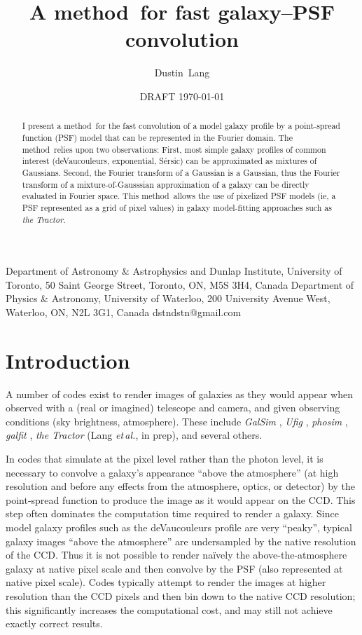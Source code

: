 \documentclass[11pt,preprint]{aastex}
\newcommand{\foreign}[1]{\emph{#1}}
\newcommand{\etal}{\foreign{et\,al.}}
\newcommand{\project}[1]{\textsl{#1}}
\newcommand{\trick}{method}
\begin{document}
\title{A \trick\ for fast galaxy--PSF convolution}
\author{Dustin~Lang}
%
{Department of Astronomy \& Astrophysics and Dunlap Institute,
  University of Toronto,
  50 Saint George Street, Toronto, ON, M5S 3H4, Canada}
%
{Department of Physics \& Astronomy,
  University of Waterloo,
  200 University Avenue West,
  Waterloo, ON, N2L 3G1, Canada}
%
{dstndstn@gmail.com}
\date{DRAFT \today}

\begin{abstract}
  I present a \trick\ for the fast convolution of a model galaxy profile
  by a point-spread function (PSF) model that can be represented in
  the Fourier domain.  The \trick\ relies upon two observations: First, most
  simple galaxy profiles of common interest (deVaucouleurs,
  exponential, S\'ersic) can be approximated as mixtures of Gaussians.
  Second, the Fourier transform of a Gaussian is a Gaussian, thus the
  Fourier transform of a mixture-of-Gausssian approximation of a
  galaxy can be directly evaluated in Fourier space.  This \trick\ 
  allows the use of pixelized PSF models (ie, a PSF represented as a
  grid of pixel values) in galaxy model-fitting approaches such as
  \project{the Tractor}.
\end{abstract}

\section{Introduction}

A number of codes exist to render images of galaxies as they would
appear when observed with a (real or imagined) telescope and camera,
and given observing conditions (sky brightness, atmosphere).  These
include \project{GalSim} \citep{galsim}, \project{Ufig} \citep{ufig},
\project{phosim} \citep{phosim}, \project{galfit} \citep{galfit}, 
\project{the Tractor} (Lang \etal, in prep), and several others.


In codes that simulate at the pixel level rather than the photon
level, it is necessary to convolve a galaxy's appearance ``above the
atmosphere'' (at high resolution and before any effects from the
atmosphere, optics, or detector) by the point-spread function to
produce the image as it would appear on the CCD.  This step often
dominates the computation time required to render a galaxy.  Since
model galaxy profiles such as the deVaucouleurs profile are very
``peaky'', typical galaxy images ``above the atmosphere'' are
undersampled by the native resolution of the CCD.  Thus it is not
possible to render na\"ively the above-the-atmosphere galaxy at native
pixel scale and then convolve by the PSF (also represented at native
pixel scale).  Codes typically attempt to render the images at higher
resolution than the CCD pixels and then bin down to the native CCD
resolution; this significantly increases the computational cost, and
may still not achieve exactly correct results.
\end{document}
